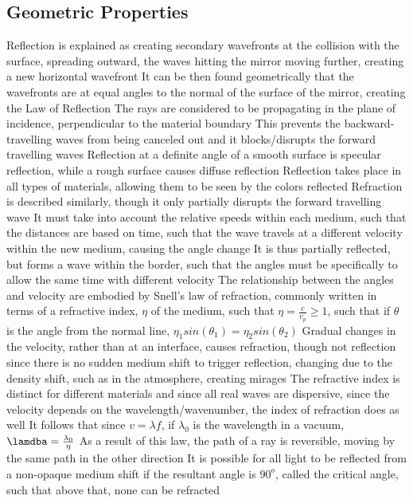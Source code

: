\documentclass[11 pt, twoside]{article}
\newenvironment{outline*}
{
	\begin{outline}[enumerate]
	}
	{\end{outline}
}
\begin{document}
\subsection{Geometric Properties}
\begin{outline*}
\1 Reflection is explained as creating secondary wavefronts at the collision with the surface, spreading outward, the waves hitting the mirror moving further, creating a new horizontal wavefront
\2 It can be then found geometrically that the wavefronts are at equal angles to the normal of the surface of the mirror, creating the Law of Reflection
\3 The rays are considered to be propagating in the plane of incidence, perpendicular to the material boundary
\2 This prevents the backward-travelling waves from being canceled out and it blocks/disrupts the forward travelling waves
\2 Reflection at a definite angle of a smooth surface is specular reflection, while a rough surface causes diffuse reflection
\2 Reflection takes place in all types of materials, allowing them to be seen by the colors reflected
\1 Refraction is described similarly, though it only partially disrupts the forward travelling wave
\2 It must take into account the relative speeds within each medium, such that the distances are based on time, such that the wave travels at a different velocity within the new medium, causing the angle change
\2 It is thus partially reflected, but forms a wave within the border, such that the angles must be specifically to allow the same time with different velocity
\1 The relationship between the angles and velocity are embodied by Snell's law of refraction, commonly written in terms of a refractive index, $\eta$ of the medium, such that $\eta = \frac{c}{v_p} \geq 1$, such that if $\theta$ is the angle from the normal line, $\eta_1 sin(\theta_1) = \eta_2 sin(\theta_2)$
\2 Gradual changes in the velocity, rather than at an interface, causes refraction, though not reflection since there is no sudden medium shift to trigger reflection, changing due to the density shift, such as in the atmosphere, creating mirages
\2 The refractive index is distinct for different materials and since all real waves are dispersive, since the velocity depends on the wavelength/wavenumber, the index of refraction does as well
\3 It follows that since $v = \lambda f$, if $\lambda_0$ is the wavelength in a vacuum, $\lamdba = \frac{\lambda_0}{\eta}$
\2 As a result of this law, the path of a ray is reversible, moving by the same path in the other direction
\2 It is possible for all light to be reflected from a non-opaque medium shift if the resultant angle is $90^o$, called the critical angle, such that above that, none can be refracted

\end{outline*}
\end{document}
